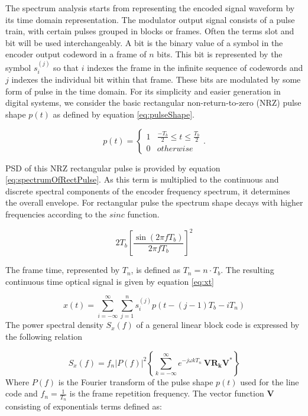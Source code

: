 The spectrum analysis starts from representing the encoded signal waveform by its time domain representation. The modulator output signal consists of a pulse train, with certain pulses grouped in blocks or frames. Often the terms slot and bit will be used interchangeably. A bit is the binary value of a symbol in the encoder output codeword in a frame of $n$ bits. This bit is represented by the symbol $s_i^{(j)}$ so that $i$ indexes the frame in the infinite sequence of codewords and $j$ indexes the individual bit within that frame. These bits are modulated by some form of pulse in the time domain. For its simplicity and easier generation in digital systems, we consider the basic rectangular non-return-to-zero (NRZ) pulse shape $p(t)$ as defined by equation \ref{eq:pulseShape}. 

\begin{equation}
\label{eq:pulseShape}
p(t) = \left\{ \begin{array}{cl}
						1&\frac{-T_b}{2} \leq t \leq \frac{T_b}{2} \\
						0&otherwise
						\end{array}
						\right..
\end{equation}

PSD of this NRZ rectangular pulse is provided by equation \ref{eq:spectrumOfRectPulse}. As this term is multiplied to the continuous and discrete spectral components of the encoder frequency spectrum, it determines the overall envelope. For rectangular pulse the spectrum shape decays with higher frequencies according to the $sinc$ function.

\begin{equation}
\label{eq:spectrumOfRectPulse}
 2 T_b \left[\frac{\sin(2\pi f T_b)}{2\pi f T_b}\right]^2
\end{equation}


The frame time, represented by $T_n$, is defined as $T_n=n\cdot T_b$. The resulting continuous time optical signal is given by equation \ref{eq:xt} 

\begin{equation}
\label{eq:xt}
    x(t) = \sum_{i= - \infty}^{\infty} \sum_{j=1}^n s_i^{(j)} p(t- (j-1)T_b - iT_n)
\end{equation}
The power spectral density $S_x(f)$ of a general linear block code is expressed by the following relation \cite{cariolaro1974spectra}

\begin{equation}
S_x(f) = f_n |P(f)|^2 \left\{  \sum_{k=-\infty}^{\infty} e^{ -j \omega k T_n}~ \mathbf{VR_k V^*} \right\}
\label{eq:spectrum_eq1}
\end{equation}
Where $P(f)$ is the Fourier transform of the pulse shape $p(t)$ used for the line code and $f_n=\frac{1}{T_n}$ is the frame repetition frequency. The vector function $\mathbf{V}$ consisting of exponentials terms defined as:

